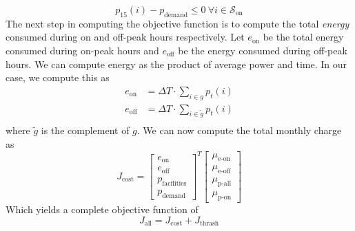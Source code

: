 \begin{equation}
	p_{15}(i) - p_{\text{demand}} \le 0 \ \forall i \in \mathcal{S}_{\text{on}}
\end{equation}
The next step in computing the objective function is to compute the total {\it energy} consumed during on and off-peak hours respectively.  Let $e_{\text{on}}$ be the total energy consumed during on-peak hours and $e_{\text{off}}$ be the energy consumed during off-peak hours. We can compute energy as the product of average power and time.  In our case, we compute this as 
\begin{equation}\begin{aligned}
	e_{\text{on}} &= \Delta T\cdot \sum_{i \in g}p_t(i) \\ 
	e_{\text{off}} &= \Delta T\cdot \sum_{i \in \tilde{g}}p_t(i) \\ 
\end{aligned}\end{equation}
where $\tilde{g}$ is the complement of $g$. We can now compute the total monthly charge as
\begin{equation}
J_{\text{cost}} = \begin{bmatrix}e_{\text{on}} \\ e_{\text{off}} \\ p_{\text{facilities}} \\ p_{\text{demand}} \end{bmatrix}^T \begin{bmatrix} \mu_{\text{e-on}} \\ \mu_{\text{e-off}} \\ \mu_{\text{p-all}} \\ \mu_{\text{p-on}} \end{bmatrix} 
\end{equation}
Which yields a complete objective function of
\begin{equation}
	J_{\text{all}} = J_{\text{cost}} + J_{\text{thrash}}
\end{equation}


